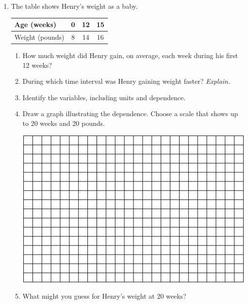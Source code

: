 \documentclass[12pt]{article}
\begin{document}
\begin{enumerate}
\item The table shows Henry's weight as a baby.
\begin{center}
\begin{tabular} {|l||c|c|c|} \hline
Age (weeks) & 0 & 12 & 15 \\ \hline
Weight (pounds) & 8 & 14 & 16 \\ \hline
\end{tabular}
\end{center}
\begin{enumerate}
\item How much weight did Henry gain, on average, each week during his first 12 weeks? \vfill
\item During which time interval was Henry gaining weight faster?  \emph{Explain.} \vfill
 \item Identify the variables, including units and dependence. \vfill
 \item Draw a graph illustrating the dependence.  Choose a scale that shows up to 20 weeks and 20 pounds. \bigskip
\begin{center}
 {\includegraphics [width = 6in] {GraphPaper.jpg}}
\end{center}

\bigskip
\item What might you guess for Henry's weight at 20 weeks?   \vfill
\end{enumerate} 

\newpage



\end{enumerate}
\end{document}
